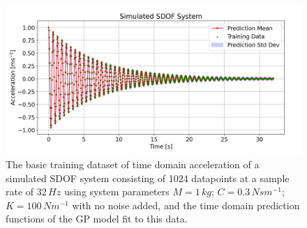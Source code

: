 \documentclass[12pt]{article}
\begin{document}
    \begin{figure}[ht]
        \centering
        \includegraphics[width=1.0\linewidth]{figures/basic-data-time-domain/basic-data-time-domain.png}
        \caption{The basic training dataset of time domain acceleration of a simulated SDOF system consisting of 1024 datapoints at a sample rate of $32 \, Hz$ using system parameters $M = 1 \, kg$; $C = 0.3 \, Nsm^{-1}$; $K = 100 \, Nm^{-1}$ with no noise added, and the time domain prediction functions of the GP model fit to this data.}
        \label{fig:basic-data-time-domain}
    \end{figure}
\end{document}

